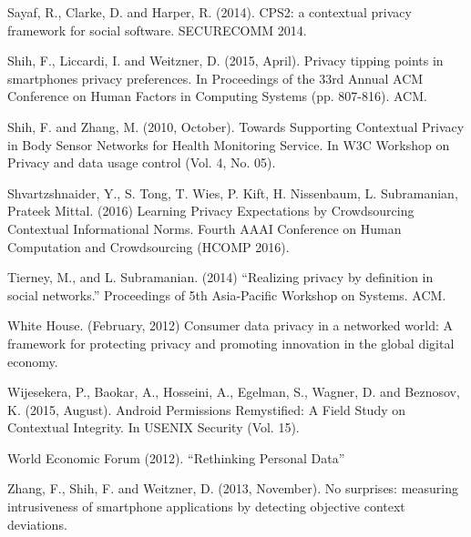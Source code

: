 \documentclass[../thesis.tex]{subfiles}
\begin{document}
\bigskip

Sayaf, R., Clarke, D. and Harper, R. (2014). CPS2: a contextual privacy
framework for social software. SECURECOMM 2014.
\cite{sayaf2014mathrm}

\bigskip

Shih, F., Liccardi, I. and Weitzner, D. (2015, April). Privacy tipping
points in smartphones privacy preferences. In Proceedings of the 33rd
Annual ACM Conference on Human Factors in Computing Systems (pp.
807-816). ACM.
\cite{shih2015privacy}

\bigskip

Shih, F. and Zhang, M. (2010, October). Towards Supporting Contextual
Privacy in Body Sensor Networks for Health Monitoring Service. In W3C
Workshop on Privacy and data usage control (Vol. 4, No. 05).
\cite{shih2010towards}

\bigskip

Shvartzshnaider, Y., S. Tong, T. Wies, P. Kift, H. Nissenbaum, L.
Subramanian, Prateek Mittal. (2016) Learning Privacy Expectations by
Crowdsourcing Contextual Informational Norms. Fourth AAAI Conference on
Human Computation and Crowdsourcing (HCOMP 2016).
\cite{shvartzshnaider2016learning}

\bigskip

Tierney, M., and L. Subramanian. (2014) ``Realizing privacy
by definition in social networks.'' Proceedings of 5th
Asia-Pacific Workshop on Systems. ACM.
\cite{tierney2014realizing}


\bigskip

White House. (February, 2012) Consumer data privacy in a networked
world: A framework for protecting privacy and promoting innovation in
the global digital economy.
\cite{house2012consumer}


\bigskip

Wijesekera, P., Baokar, A., Hosseini, A., Egelman, S., Wagner, D. and
Beznosov, K. (2015, August). Android Permissions Remystified: A Field
Study on Contextual Integrity. In USENIX Security (Vol. 15).
\cite{wijesekera2015android}

\bigskip

World Economic Forum (2012). ``Rethinking Personal Data''
\cite{wef2012rethinking}


\bigskip

Zhang, F., Shih, F. and Weitzner, D. (2013, November). No surprises:
measuring intrusiveness of smartphone applications by detecting
objective context deviations. 
\cite{zhang2013no}

\bigskip

 
\end{document}
